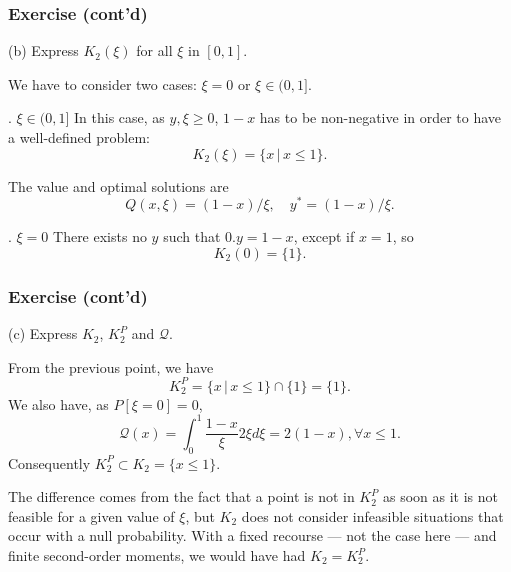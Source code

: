\documentclass[aspectratio=169]{beamer}
\begin{document}
\begin{frame}
\frametitle{Exercise (cont'd)}
	
{\blue (b)} Express $K_2(\xi)$ for all $\xi$ in $[0,1]$.
	
\mbox{}
	
We have to consider two cases: $\xi = 0$ or $\xi \in (0,1]$.
	
\mbox{}
	
{. $\xi \in (0,1]$} In this case, as $y, \xi \geq 0$, $1-x$ has to be non-negative in order to have a well-defined problem:
\[
K_2(\xi) = \lbrace x\,|\, x \leq 1 \rbrace.
\]

The value and optimal solutions are
\[
Q(x,\xi) = (1-x)/\xi,\quad y^*= (1-x)/\xi.
\]
	
{. $\xi=0$} There exists no $y$ such that $0.y = 1-x$, except if $x = 1$, so
\[
K_2(0) = \lbrace 1 \rbrace.
\]
	
\end{frame}

\begin{frame}
\frametitle{Exercise (cont'd)}
	
{\blue (c)} Express $K_2$, $K_2^P$ and $\mathcal{Q}$.
	
\mbox{}
	
From the previous point, we have
\[
K_2^P = \lbrace x \,|\, x \leq 1 \rbrace \cap \lbrace 1 \rbrace =
\lbrace 1 \rbrace.
\]
We also have, as $P[\xi = 0] = 0$,
\[
\mathcal{Q}(x) = \int_0^1 \frac{1-x}{\xi} 2\xi d\xi = 2(1-x), \forall
x \leq 1.
\]
Consequently $K_2^P \subset K_2 = \lbrace x \leq 1 \rbrace$.

The difference comes from the fact that a point is not in $K_2^P$ as soon as it is not feasible for a given value of $\xi$, but $K_2$ does not consider infeasible situations that occur with a null probability.
	With a {\red fixed} recourse --- not the case here --- and finite second-order moments, we would have had $K_2 = K_2^P$.
	
\end{frame}
\end{document}
